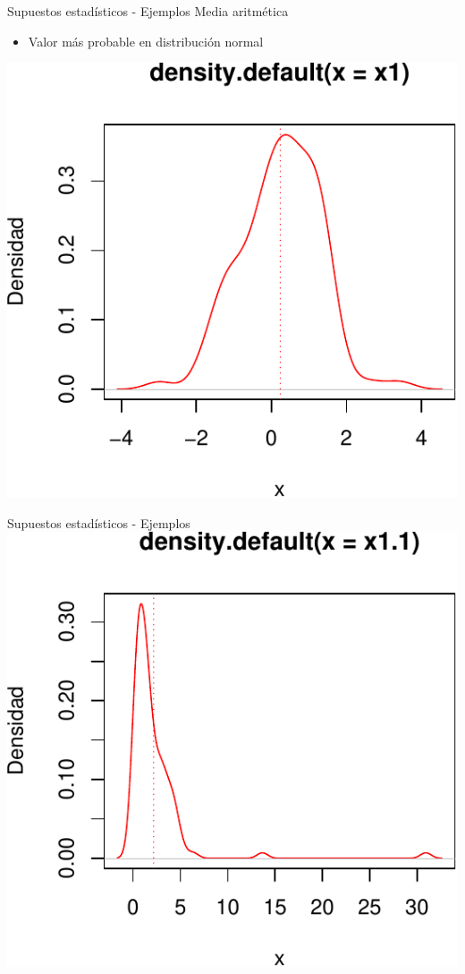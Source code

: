 \documentclass[
  11pt,
  ignorenonframetext,
]{beamer}
\providecommand{\tightlist}{%
  \setlength{\itemsep}{0pt}\setlength{\parskip}{0pt}}
\begin{document}
\begin{frame}{Supuestos estadísticos - Ejemplos}
\protect\hypertarget{supuestos-estaduxedsticos---ejemplos}{}
Media aritmética

\begin{itemize}
\tightlist
\item
  Valor más probable en distribución normal
\end{itemize}

\includegraphics{Particularidades_files/figure-beamer/unnamed-chunk-1-1.pdf}
\end{frame}

\begin{frame}{Supuestos estadísticos - Ejemplos}
\protect\hypertarget{supuestos-estaduxedsticos---ejemplos-1}{}
\includegraphics{Particularidades_files/figure-beamer/unnamed-chunk-2-1.pdf}
\end{frame}
\end{document}
